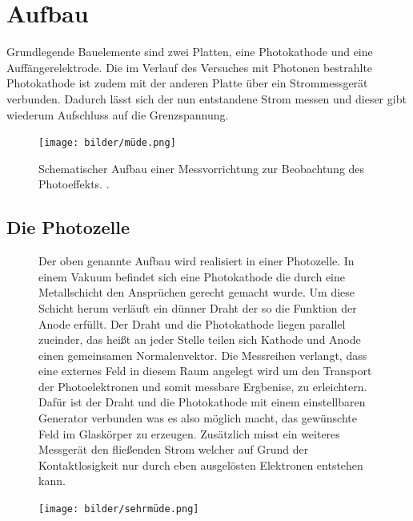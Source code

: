 \section{Aufbau}
Grundlegende Bauelemente sind zwei Platten, eine Photokathode und eine Auffängerelektrode.
Die im Verlauf des Versuches mit Photonen bestrahlte Photokathode ist zudem mit der anderen Platte über ein Strommessgerät verbunden.
Dadurch lässt sich der nun entstandene Strom messen und dieser gibt wiederum Aufschluss auf die Grenzspannung.

\begin{figure}
    \centering
    \texttt{[image: bilder/müde.png]}
    \caption{Schematischer Aufbau einer Messvorrichtung zur Beobachtung des Photoeffekts. \cite{skript}.} 
    \label{fig:müde1}
\end{figure}
\FloatBarrier
\subsection{Die Photozelle}
\begin{figure}
    \begin{minipage}{0.5\textwidth}
Der oben genannte Aufbau wird realisiert in einer Photozelle. In einem Vakuum befindet sich eine Photokathode die durch 
eine Metallschicht den Ansprüchen gerecht gemacht wurde. Um diese Schicht herum verläuft ein dünner Draht der so die Funktion der Anode 
erfüllt. Der Draht und die Photokathode liegen parallel zueinder, das heißt an jeder Stelle teilen sich Kathode und Anode einen gemeinsamen Normalenvektor.
Die Messreihen verlangt, dass eine externes Feld in diesem Raum angelegt wird um den Transport der Photoelektronen und somit 
messbare Ergbenise, zu erleichtern.  Dafür ist der Draht und die Photokathode mit einem einstellbaren Generator verbunden was es also möglich macht, 
das gewünschte Feld im Glaskörper zu erzeugen. Zusätzlich misst ein weiteres Messgerät den fließenden Strom welcher auf Grund 
der Kontaktlosigkeit nur durch eben ausgelösten Elektronen entstehen kann. 
     \end{minipage}
\hfill
    \begin{minipage}{0.5\textwidth}
        \centering
        \texttt{[image: bilder/sehrmüde.png]}
        \captionsetup{justification=centering}
    \label{fig:sehrmüde}
    \end{minipage}
\end{figure}

